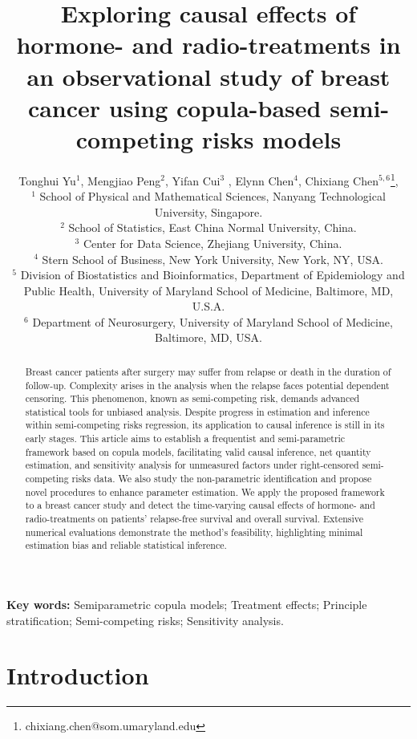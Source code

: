 \documentclass[12pt]{article}
\title{Exploring causal effects of hormone- and radio-treatments in an observational study of breast cancer using copula-based semi-competing risks models}
\author{Tonghui Yu$^1$, Mengjiao Peng$^2$, Yifan Cui$^3$ , Elynn Chen$^{4}$, Chixiang Chen$^{5,6}$\thanks{chixiang.chen@som.umaryland.edu}, 
\hspace{.2cm} \\ 
$^1$ School of Physical and Mathematical Sciences, Nanyang Technological University, Singapore.\\
$^2$ School of Statistics, East China Normal University, China.\\
$^3$ Center for Data Science, Zhejiang University, China.\\
$^4$ Stern School of Business, New York University, New York, NY, USA.\\
$^5$ Division of Biostatistics and Bioinformatics, Department of Epidemiology and Public Health, University of Maryland School of Medicine, Baltimore, MD, U.S.A.\\
$^6$ Department of Neurosurgery, University of Maryland School of Medicine, Baltimore, MD, USA.
}
\date{}
\theoremstyle{plain}
\begin{document}
\maketitle



\begin{abstract}
Breast cancer patients after surgery may suffer from relapse or death in the duration of follow-up. Complexity arises in the analysis when the relapse faces potential dependent censoring. This phenomenon, known as semi-competing risk, demands advanced statistical tools for unbiased analysis. Despite progress in estimation and inference within semi-competing risks regression, its application to causal inference is still in its early stages. This article aims to establish a frequentist and semi-parametric framework based on copula models, facilitating valid causal inference, net quantity estimation, and sensitivity analysis for unmeasured factors under right-censored semi-competing risks data. We also study the non-parametric identification and propose novel procedures to enhance parameter estimation. We apply the proposed framework to a breast cancer study and detect the time-varying causal effects of hormone- and radio-treatments on patients' relapse-free survival and overall survival. Extensive numerical evaluations demonstrate the method's feasibility, highlighting minimal estimation bias and reliable statistical inference. %


\end{abstract}

\textbf{Key words:}
Semiparametric copula models; Treatment effects; Principle stratification; Semi-competing risks;  Sensitivity analysis.

\section{Introduction}



\label{s:intro}
\end{document}
